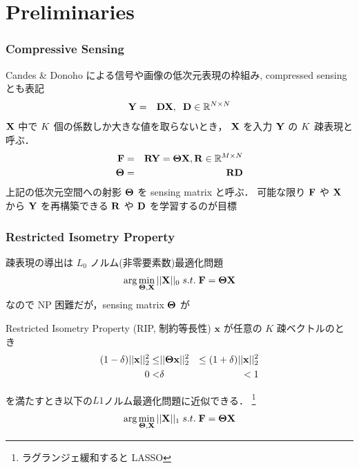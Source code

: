 \section{Preliminaries}

\begin{frame}\frametitle{Compressive Sensing}
Candes \& Donoho\cite{Donoho2006} による信号や画像の低次元表現の枠組み, compressed sensing とも表記
\begin{eqnarray}
    {\mathbf{Y}} & = & {\mathbf{D}} {\mathbf{X}}, \;\;
    {\mathbf{D}} \in {\mathbb{R}^{N\times N}}
\end{eqnarray}
${\mathbf{X}}$ 中で $K$ 個の係数しか大きな値を取らないとき，
${\mathbf{X}}$ を入力 ${\mathbf{Y}}$ の $K$ 疎表現と呼ぶ．
\begin{eqnarray}
    {\mathbf{F}} & = & {\mathbf{R}} {\mathbf{Y}} = {\mathbf{\Theta}} {\mathbf{X}},
    {\mathbf{R}} \in {\mathbb{R}^{M\times N}} \\
    {\mathbf{\Theta}} & = & {\mathbf{R}} {\mathbf{D}}
\end{eqnarray}
上記の低次元空間への射影 ${\mathbf{\Theta}}$ を sensing matrix と呼ぶ．
可能な限り ${\mathbf{F}}$ や ${\mathbf{X}}$ から ${\mathbf{Y}}$ を再構築できる ${\mathbf{R}}$ や ${\mathbf{D}}$ を学習するのが目標
\end{frame}


\begin{frame}\frametitle{Restricted Isometry Property}
疎表現の導出は $L_0$ ノルム(非零要素数)最適化問題
\begin{equation}
    \arg\min_{{\mathbf{\Theta}}, {\mathbf{X}}} ||{\mathbf{X}}||_0 \; s.t. \; {\mathbf{F}} = {\mathbf{\Theta}} {\mathbf{X}}
\end{equation}
なので NP 困難だが，sensing matrix ${\mathbf{\Theta}}$ が
\begin{block}{Restricted Isometry Property (RIP, 制約等長性)}
$\mathbf{x}$ が任意の $K$ 疎ベクトルのとき
\begin{eqnarray}
    (1 - \delta) ||\mathbf{x}||^2_2 \leq & || {\mathbf{\Theta}} \mathbf{x}
    ||^2_2 & \leq (1 + \delta) ||\mathbf{x}||^2_2 \\
    0 < & \delta & < 1
\end{eqnarray}
\end{block}
を満たすとき以下の$L1$ノルム最適化問題に近似できる\cite{Candes2008}．
\footnote{ラグランジェ緩和すると LASSO\cite{Mairal2014}}
\begin{equation}
    \arg\min_{{\mathbf{\Theta}}, {\mathbf{X}}}  ||{\mathbf{X}}||_1 \; s.t. \; {\mathbf{F}} = {\mathbf{\Theta}} {\mathbf{X}}
    \label{candes}
\end{equation}
\end{frame}


